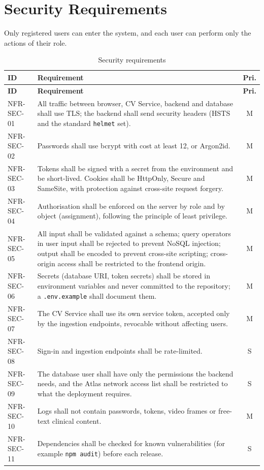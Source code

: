 \documentclass[a4paper,11pt]{scrreprt}
\makeatletter
\newenvironment{reqtable}[1]{%
  \small
  \begin{longtable}{@{}>{\ttfamily\footnotesize}p{2.55cm}>{\raggedright\arraybackslash}p{10.7cm}c@{}}
  \caption{#1}\\
  \toprule \textbf{ID} & \textbf{Requirement} & \textbf{Pri.}\\ \midrule
  \endfirsthead
  \toprule \textbf{ID} & \textbf{Requirement} & \textbf{Pri.}\\ \midrule
  \endhead
  \bottomrule
  \endfoot
}{%
  \end{longtable}\normalsize
}
\newcommand{\req}[3]{#1 & #2 & #3 \\ \midrule}
\newcommand{\code}[1]{\texttt{#1}}
\makeatother
\begin{document}
\section{Security Requirements}
Only registered users can enter the system, and each user can perform only the actions of their role.
\begin{reqtable}{Security requirements}
\req{NFR-SEC-01}{All traffic between browser, CV Service, backend and database shall use TLS; the backend shall send security headers (HSTS and the standard \code{helmet} set).}{M}
\req{NFR-SEC-02}{Passwords shall use bcrypt with cost at least 12, or Argon2id.}{M}
\req{NFR-SEC-03}{Tokens shall be signed with a secret from the environment and be short-lived. Cookies shall be HttpOnly, Secure and SameSite, with protection against cross-site request forgery.}{M}
\req{NFR-SEC-04}{Authorisation shall be enforced on the server by role and by object (assignment), following the principle of least privilege.}{M}
\req{NFR-SEC-05}{All input shall be validated against a schema; query operators in user input shall be rejected to prevent NoSQL injection; output shall be encoded to prevent cross-site scripting; cross-origin access shall be restricted to the frontend origin.}{M}
\req{NFR-SEC-06}{Secrets (database URI, token secrets) shall be stored in environment variables and never committed to the repository; a \code{.env.example} shall document them.}{M}
\req{NFR-SEC-07}{The CV Service shall use its own service token, accepted only by the ingestion endpoints, revocable without affecting users.}{M}
\req{NFR-SEC-08}{Sign-in and ingestion endpoints shall be rate-limited.}{S}
\req{NFR-SEC-09}{The database user shall have only the permissions the backend needs, and the Atlas network access list shall be restricted to what the deployment requires.}{S}
\req{NFR-SEC-10}{Logs shall not contain passwords, tokens, video frames or free-text clinical content.}{M}
\req{NFR-SEC-11}{Dependencies shall be checked for known vulnerabilities (for example \code{npm audit}) before each release.}{S}
\end{reqtable}
\end{document}
